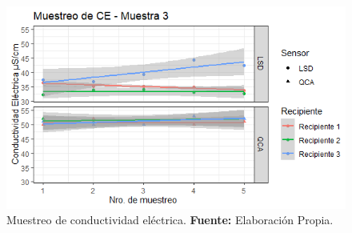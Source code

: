     \begin{figure}[H]
        \centering
        \includegraphics[width=0.75\linewidth]{Imagenes/cap4/CE_M3.png}
        \caption {Muestreo de conductividad el\'ectrica. \textbf{Fuente:}
        Elaboraci\'on Propia. }
        \label{fig:M3CE}
    \end{figure}

